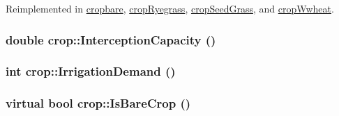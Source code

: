 Reimplemented in \hyperlink{classcropbare_ab9e81123fa54843efce5da0861e401f6}{cropbare}, \hyperlink{classcrop_ryegrass_a33a0c70645ce03afc49541e8d3f4919b}{cropRyegrass}, \hyperlink{classcrop_seed_grass_a3415f1b4d08da621709cbb07156137e0}{cropSeedGrass}, and \hyperlink{classcrop_wwheat_a846500070e461386ab5c309a9e6cd388}{cropWwheat}.\hypertarget{classcrop_aa0e3e053a447eb7b6389099e9e93e672}{
\subsubsection[{InterceptionCapacity}]{\setlength{\rightskip}{0pt plus 5cm}double crop::InterceptionCapacity ()}}
\label{classcrop_aa0e3e053a447eb7b6389099e9e93e672}
\hypertarget{classcrop_a2094690538653a0a491682b12ae2da3e}{
\subsubsection[{IrrigationDemand}]{\setlength{\rightskip}{0pt plus 5cm}int crop::IrrigationDemand ()}}
\label{classcrop_a2094690538653a0a491682b12ae2da3e}
\hypertarget{classcrop_a8dd9a3a833e045f767eb3a6abd5f9677}{
\subsubsection[{IsBareCrop}]{\setlength{\rightskip}{0pt plus 5cm}virtual bool crop::IsBareCrop ()}}
\label{classcrop_a8dd9a3a833e045f767eb3a6abd5f9677}


